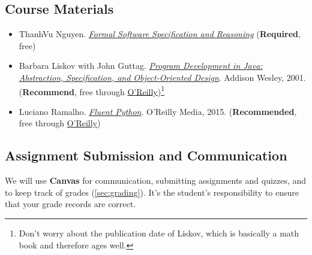 \documentclass[11pt]{article}
\begin{document}
\subsection{Course Materials}
\begin{itemize}
    \item ThanhVu Nguyen. \href{https://nguyenthanhvuh.github.io/class-oo/oop.pdf}{\emph{Formal Software Specification and Reasoning}} (\textbf{Required}, free)


    \item Barbara Liskov with John Guttag. \href{https://www.amazon.com/Program-Development-Java-Specification-Object-Oriented/dp/0201657686/ref=sr_1_2?dchild=1&qid=1626231221&refinements=p_27\%3ABarbara+Liskov&s=books&sr=1-2&text=Barbara+Liskov}{\emph{Program
  Development in Java: Abstraction, Specification, and Object-Oriented  Design}}. Addison Wesley, 2001.  (\textbf{Recommend}, free through \href{https://learning.oreilly.com/library/view/program-development-in/9780768685299/}{ O'Reilly})\footnote{Don't worry about the publication date of Liskov, which is basically a math book and therefore ages well.}

    \item Luciano Ramalho. \href{https://www.amazon.com/Fluent-Python-Concise-Effective-Programming-dp-1492056359/dp/1492056359/ref=dp_ob_title_bk}{\emph{Fluent Python}}. O'Reilly Media, 2015. (\textbf{Recommended}, free through \href{https://learning.oreilly.com/library/view/fluent-python/9781492056348/}{O'Reilly})


\end{itemize}


\subsection{Assignment Submission and Communication}

We will use \textbf{Canvas} for communication, submitting assignments and quizzes, and to keep track of grades (\autoref{sec:grading}).  
It's the student's responsibility to ensure that your grade records are correct.
\end{document}
